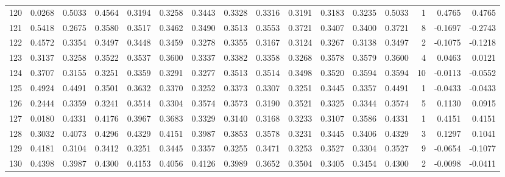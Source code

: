 \begin{tabular}{lrrrrrrrrrrrrrrr}
120 &      0.0268 &  0.5033 &  0.4564 &  0.3194 &  0.3258 &  0.3443 &  0.3328 &  0.3316 &  0.3191 &  0.3183 &   0.3235 &     0.5033 &      1 &                    0.4765 &                     0.4765 \\
121 &      0.5418 &  0.2675 &  0.3580 &  0.3517 &  0.3462 &  0.3490 &  0.3513 &  0.3553 &  0.3721 &  0.3407 &   0.3400 &     0.3721 &      8 &                   -0.1697 &                    -0.2743 \\
122 &      0.4572 &  0.3354 &  0.3497 &  0.3448 &  0.3459 &  0.3278 &  0.3355 &  0.3167 &  0.3124 &  0.3267 &   0.3138 &     0.3497 &      2 &                   -0.1075 &                    -0.1218 \\
123 &      0.3137 &  0.3258 &  0.3522 &  0.3537 &  0.3600 &  0.3337 &  0.3382 &  0.3358 &  0.3268 &  0.3578 &   0.3579 &     0.3600 &      4 &                    0.0463 &                     0.0121 \\
124 &      0.3707 &  0.3155 &  0.3251 &  0.3359 &  0.3291 &  0.3277 &  0.3513 &  0.3514 &  0.3498 &  0.3520 &   0.3594 &     0.3594 &     10 &                   -0.0113 &                    -0.0552 \\
125 &      0.4924 &  0.4491 &  0.3501 &  0.3632 &  0.3370 &  0.3252 &  0.3373 &  0.3307 &  0.3251 &  0.3445 &   0.3357 &     0.4491 &      1 &                   -0.0433 &                    -0.0433 \\
126 &      0.2444 &  0.3359 &  0.3241 &  0.3514 &  0.3304 &  0.3574 &  0.3573 &  0.3190 &  0.3521 &  0.3325 &   0.3344 &     0.3574 &      5 &                    0.1130 &                     0.0915 \\
127 &      0.0180 &  0.4331 &  0.4176 &  0.3967 &  0.3683 &  0.3329 &  0.3140 &  0.3168 &  0.3233 &  0.3107 &   0.3586 &     0.4331 &      1 &                    0.4151 &                     0.4151 \\
128 &      0.3032 &  0.4073 &  0.4296 &  0.4329 &  0.4151 &  0.3987 &  0.3853 &  0.3578 &  0.3231 &  0.3445 &   0.3406 &     0.4329 &      3 &                    0.1297 &                     0.1041 \\
129 &      0.4181 &  0.3104 &  0.3412 &  0.3251 &  0.3445 &  0.3357 &  0.3255 &  0.3471 &  0.3253 &  0.3527 &   0.3304 &     0.3527 &      9 &                   -0.0654 &                    -0.1077 \\
130 &      0.4398 &  0.3987 &  0.4300 &  0.4153 &  0.4056 &  0.4126 &  0.3989 &  0.3652 &  0.3504 &  0.3405 &   0.3454 &     0.4300 &      2 &                   -0.0098 &                    -0.0411 \\

\end{tabular}
